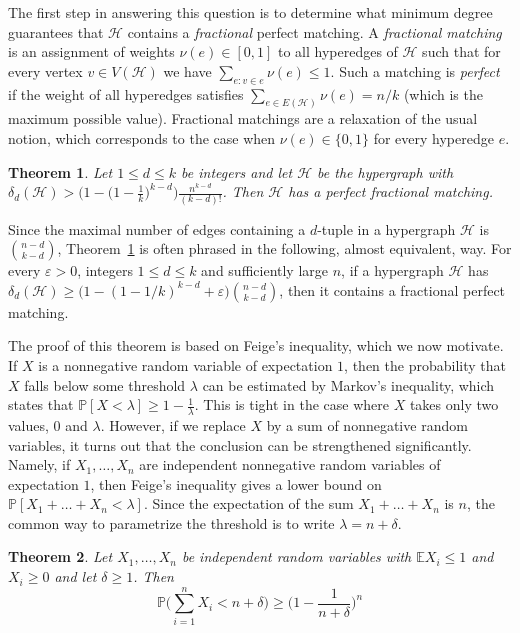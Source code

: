 \documentclass[10pt,a4paper]{article}
\newtheorem{theorem}{Theorem}
\newcommand{\bE}{\mathbb{E}}
\newcommand{\cH}{\mathcal{H}}
\newcommand{\Pb}{\mathbb P}
\begin{document}
\noindent
The first step in answering this question is to determine what minimum degree guarantees that $\cH$ contains a \textit{fractional} perfect matching. A \textit{fractional matching} is an assignment of weights $\nu(e)\in [0, 1]$ to all hyperedges of $\cH$ such that for every vertex $v\in V(\cH)$ we have $\sum_{e:v\in e}\nu(e)\leq 1$. Such a matching is \textit{perfect} if the weight of all hyperedges satisfies $\sum_{e\in E(\cH)}\nu(e)=n/k$ (which is the maximum possible value). Fractional matchings are a relaxation of the usual notion, which corresponds to the case when $\nu(e)\in \{0, 1\}$ for every hyperedge $e$.

\begin{theorem}\label{thm:fractional_matching}
Let $1\leq d\leq k$ be integers and let $\cH$ be the hypergraph with $\delta_d (\cH)> \Big(1-\big(1-\frac{1}{k}\big)^{k-d}\Big)\frac{n^{k-d}}{(k-d)!}$. Then $\cH$ has a perfect fractional matching.
\end{theorem}

Since the maximal number of edges containing a $d$-tuple in a hypergraph $\cH$ is $\binom{n-d}{k-d}$, Theorem~\ref{thm:fractional_matching} is often phrased in the following, almost equivalent, way. For every $\varepsilon>0$, integers $1\leq d\leq k$ and sufficiently large $n$, if a hypergraph $\cH$ has $\delta_d(\cH)\geq \big(1-(1-1/k)^{k-d}+\varepsilon)\binom{n-d}{k-d}$, then it contains a fractional perfect matching.


The proof of this theorem is based on Feige's inequality, which we now motivate. If $X$ is a nonnegative random variable of expectation $1$, then the probability that $X$ falls below some threshold $\lambda$ can be estimated by Markov's inequality, which states that $\Pb[X< \lambda]\geq 1-\frac{1}{\lambda}$. This is tight in the case where $X$ takes only two values, $0$ and $\lambda$. However, if we replace $X$ by a sum of nonnegative random variables, it turns out that the conclusion can be strengthened significantly. Namely, if $X_1, \dots, X_n$ are independent nonnegative random variables of expectation $1$, then Feige's inequality gives a lower bound on $\Pb[X_1+\dots+X_n<\lambda]$. Since the expectation of the sum $X_1+\dots+X_n$ is $n$, the common way to parametrize the threshold is to write $\lambda=n+\delta$. 


\begin{theorem}\label{thm:feige}
Let $X_1,\ldots,X_n$ be independent random variables with $\bE X_i\leq 1$ and $X_i\geq 0$ and let $\delta\geq 1$. Then
\vspace{-0.2cm}
\[
 \Pb\Big(\sum_{i=1}^n X_i<n+\delta\Big) \geq \Big(1-\frac{1}{n+\delta}\Big)^n
\]
\end{theorem}
\end{document}
